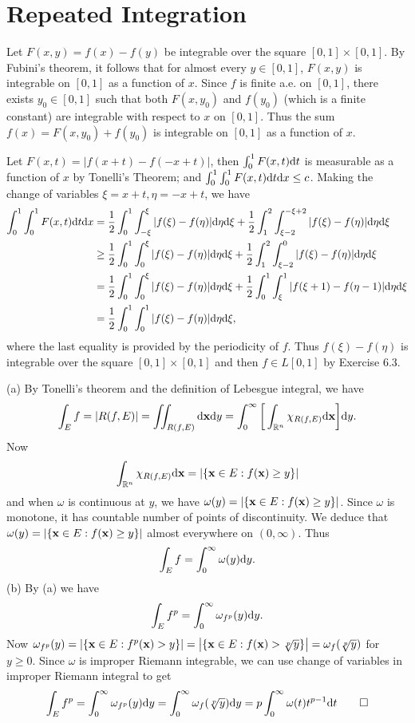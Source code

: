 \section{Repeated Integration}
\begin{exercise}{6.3}
Let $F(x,y)=f(x)-f(y)$ be integrable over the square $[0,1]\times [0,1]$. By Fubini's theorem, it follows that for almost every $y\in [0,1]$, $F(x,y)$ is integrable on $[0,1]$ as a function of $x$. Since $f$ is finite a.e. on $[0,1]$, there exists $y_0\in[0,1]$ such that both $F(x,y_0)$ and $f(y_0)$ (which is a finite constant) are integrable with respect to $x$ on $[0,1]$. Thus the sum $f(x)=F(x,y_0)+f(y_0)$ is integrable on $[0,1]$ as a function of $x$.
\end{exercise}
\begin{exercise}{6.4}
Let $F(x,t)=|f(x+t)-f(-x+t)|$, then $\int_0^1F(x,t)\mathrm{d} t$ is measurable as a function of $x$ by Tonelli's Theorem; and $\int_0^1\int^1_0F(x,t)\mathrm{d} t\mathrm{d} x\leq c$. Making the change of variables $\xi=x+t, \eta=-x+t$, we have
\begin{equation*}
	\begin{aligned}
	\int_0^1\int^1_0F(x,t)\mathrm{d} t\mathrm{d} x&=\frac{1}{2}\int_0^1\int_{-\xi}^\xi|f(\xi)-f(\eta)|\mathrm{d} \eta\mathrm{d} \xi+\frac{1}{2}\int_1^2\int_{\xi-2}^{-\xi+2}|f(\xi)-f(\eta)|\mathrm{d} \eta \mathrm{d} \xi\\
	&\geq\frac{1}{2}\int_0^1\int_{0}^\xi|f(\xi)-f(\eta)|\mathrm{d} \eta \mathrm{d} \xi + \frac{1}{2}\int_1^2\int_{\xi-2}^{0}|f(\xi)-f(\eta)|\mathrm{d} \eta \mathrm{d} \xi\\
&	=\frac{1}{2}\int_0^1\int_{0}^\xi|f(\xi)-f(\eta)|\mathrm{d} \eta \mathrm{d} \xi + \frac{1}{2}\int_0^1\int_{\xi}^{1}|f(\xi+1)-f(\eta-1)|\mathrm{d} \eta \mathrm{d} \xi\\
	&=\frac{1}{2}\int_0^1\int_0^1|f(\xi)-f(\eta)|\mathrm{d}\eta\mathrm{d}\xi,
	\end{aligned}
\end{equation*}
where the last equality is provided by the periodicity of $f$. Thus $f(\xi)-f(\eta)$ is integrable over the square $[0,1]\times [0,1]$ and then $f\in L[0,1]$ by Exercise 6.3.
\end{exercise}
\begin{exercise}{6.5}
  (a) By Tonelli's theorem and the definition of Lebesgue integral, we have
  \[
    \int_Ef=\left\vert R(f,E)\right\vert=\iint_{R(f,E)}\mathrm{d}\mathbf{x} \mathrm{d} y=\int_0^\infty\bigg[\int_{\mathbb{R}^n}\chi_{R(f,E)}\mathrm{d}\mathbf{x}\bigg]\mathrm{d} y.
  \]
  Now
  \[
    \int_{\mathbb{R}^n}\chi_{R(f,E)}\mathrm{d}\mathbf{x}=\left\vert\{\mathbf{x}\in E:f(\mathbf{x})\geq y\}\right\vert
  \] 
  and when $\omega$ is continuous at $y$, we have $\omega(y)=\left\vert\{\mathbf{x}\in E:f(\mathbf{x})\geq y\}\right\vert$. Since $\omega$ is monotone, it has countable number of points of discontinuity. We deduce that $\omega(y)=\left\vert\{\mathbf{x}\in E:f(\mathbf{x})\geq y\}\right\vert$ almost everywhere on $(0,\infty)$. Thus
  \[
    \int_Ef=\int_0^\infty\omega(y)\mathrm{d} y.
  \]
  (b) By (a) we have \[\int_Ef^p=\int_0^\infty\omega_{f^p}(y)\mathrm{d} y.\]Now $\omega_{f^p}(y)=\left\vert\{\mathbf{x}\in E:f^p(\mathbf{x})>y\}\right\vert=\left\vert\{\mathbf{x}\in E:f(\mathbf{x})>\sqrt[p]{y}\}\right\vert=\omega_f(\sqrt[p]{y})$ for $y\geq 0$. Since $\omega$ is improper Riemann integrable, we can use change of variables in improper Riemann integral to get
  \[
    \int_Ef^p=\int_0^\infty\omega_{f^p}(y)\mathrm{d} y=\int_0^\infty\omega_f(\sqrt[p]{y})\mathrm{d} y=p\int_0^\infty\omega(t)t^{p-1}\mathrm{d} t
    \qedhere
  \]
\end{exercise}
